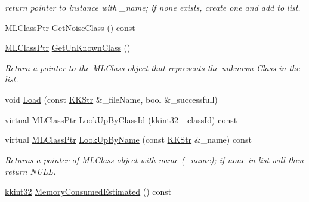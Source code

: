 \begin{DoxyCompactItemize}
\begin{DoxyCompactList}\small\item\em return pointer to instance with \textquotesingle{}\+\_\+name\textquotesingle{}; if none exists, create one and add to list. \end{DoxyCompactList}\item 
\hyperlink{namespace_k_k_m_l_l_ac272393853d59e72e8456f14cd6d8c23}{M\+L\+Class\+Ptr} \hyperlink{class_k_k_m_l_l_1_1_m_l_class_list_a77141f2b961011b6be8e6f2b0e929706}{Get\+Noise\+Class} () const 
\item 
\hyperlink{namespace_k_k_m_l_l_ac272393853d59e72e8456f14cd6d8c23}{M\+L\+Class\+Ptr} \hyperlink{class_k_k_m_l_l_1_1_m_l_class_list_aa7bab9ad8566d1ae97269775bab02446}{Get\+Un\+Known\+Class} ()
\begin{DoxyCompactList}\small\item\em Return a pointer to the \hyperlink{class_k_k_m_l_l_1_1_m_l_class}{M\+L\+Class} object that represents the unknown Class in the list. \end{DoxyCompactList}\item 
void \hyperlink{class_k_k_m_l_l_1_1_m_l_class_list_acde90816dd424592c0e2971be8a80783}{Load} (const \hyperlink{class_k_k_b_1_1_k_k_str}{K\+K\+Str} \&\+\_\+file\+Name, bool \&\+\_\+successfull)
\item 
virtual \hyperlink{namespace_k_k_m_l_l_ac272393853d59e72e8456f14cd6d8c23}{M\+L\+Class\+Ptr} \hyperlink{class_k_k_m_l_l_1_1_m_l_class_list_ac4806e641c090dcc7f572a3774604de4}{Look\+Up\+By\+Class\+Id} (\hyperlink{namespace_k_k_b_a8fa4952cc84fda1de4bec1fbdd8d5b1b}{kkint32} \+\_\+class\+Id) const 
\item 
virtual \hyperlink{namespace_k_k_m_l_l_ac272393853d59e72e8456f14cd6d8c23}{M\+L\+Class\+Ptr} \hyperlink{class_k_k_m_l_l_1_1_m_l_class_list_a7e0cacbce01e93066c8dc89acb232e3c}{Look\+Up\+By\+Name} (const \hyperlink{class_k_k_b_1_1_k_k_str}{K\+K\+Str} \&\+\_\+name) const 
\begin{DoxyCompactList}\small\item\em Returns a pointer of \hyperlink{class_k_k_m_l_l_1_1_m_l_class}{M\+L\+Class} object with name (\+\_\+name); if none in list will then return N\+U\+LL. \end{DoxyCompactList}\item 
\hyperlink{namespace_k_k_b_a8fa4952cc84fda1de4bec1fbdd8d5b1b}{kkint32} \hyperlink{class_k_k_m_l_l_1_1_m_l_class_list_a733c0cdb921878aaf5cebd7de4527e09}{Memory\+Consumed\+Estimated} () const 
\item 

\end{DoxyCompactItemize}
